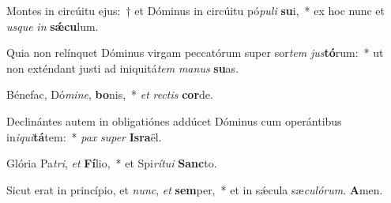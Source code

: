 Montes in circúitu ejus:~† et Dóminus in circúitu pó\textit{pu}\textit{li} \textbf{su}i,~* ex hoc nunc et \textit{us}\textit{que} \textit{in} \textbf{sǽ}\textbf{cu}lum.

Quia non relínquet Dóminus virgam peccatórum super sor\textit{tem} \textit{jus}\textbf{tó}rum:~* ut non exténdant justi ad iniquitá\textit{tem} \textit{ma}\textit{nus} \textbf{su}as.

Bénefac, Dó\textit{mi}\textit{ne}, \textbf{bo}nis,~* \textit{et} \textit{rec}\textit{tis} \textbf{cor}de.

Declinántes autem in obligatiónes addúcet Dóminus cum operántibus in\textit{i}\textit{qui}\textbf{tá}tem:~* \textit{pax} \textit{su}\textit{per} \textbf{Is}\textbf{ra}ël.

Glória Pa\textit{tri}, \textit{et} \textbf{Fí}lio,~* et Spi\textit{rí}\textit{tu}\textit{i} \textbf{Sanc}to.

Sicut erat in princípio, et \textit{nunc}, \textit{et} \textbf{sem}per,~* et in sǽcula sæ\textit{cu}\textit{ló}\textit{rum}. \textbf{A}men.
